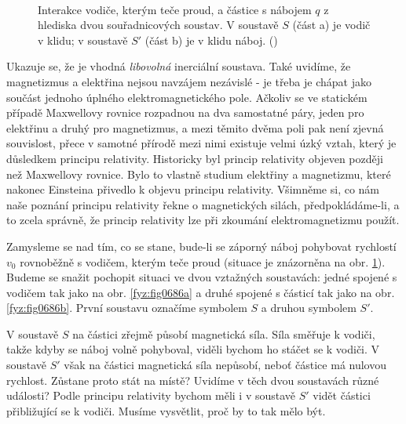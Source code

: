     \begin{figure}[ht!]  %
      \centering
       \\
      \caption{Interakce vodiče, kterým teče proud, a částice s nábojem \(q\) z hlediska dvou
              souřadnicových soustav. V soustavě \(S\) (část a) je vodič v klidu; v soustavě \(S'\)
              (část b) je v klidu náboj. (\cite[s.~234]{Feynman02})}
      \label{fyz:fig0686}
    \end{figure}

    Ukazuje se, že je vhodná \emph{libovolná} inerciální soustava. Také uvidíme, že magnetizmus a
    elektřina nejsou navzájem nezávislé - je třeba je chápat jako součást jednoho úplného
    elektromagnetického pole. Ačkoliv se ve statickém případě Maxwellovy rovnice rozpadnou na dva
    samostatné páry, jeden pro elektřinu a druhý pro magnetizmus, a mezi těmito dvěma poli pak není
    zjevná souvislost, přece v samotné přírodě mezi nimi existuje velmi úzký vztah, který je
    důsledkem principu relativity. Historicky byl princip relativity objeven později než Maxwellovy
    rovnice. Bylo to vlastně studium elektřiny a magnetizmu, které nakonec Einsteina přivedlo k
    objevu principu relativity. Všimněme si, co nám naše poznání principu relativity řekne o
    magnetických silách, předpokládáme-li, a to zcela správně, že princip relativity lze při
    zkoumání elektromagnetizmu použít.

    Zamysleme se nad tím, co se stane, bude-li se záporný náboj pohybovat rychlostí \(v_0\)
    rovnoběžně s vodičem, kterým teče proud (situace je znázorněna na obr. \ref{fyz:fig0686}). Budeme
    se snažit pochopit situaci ve dvou vztažných soustavách: jedné spojené s vodičem tak jako na
    obr. \ref{fyz:fig0686a} a druhé spojené s částicí tak jako na obr. \ref{fyz:fig0686b}. První
    soustavu označíme symbolem \(S\) a druhou symbolem \(S'\).

    V soustavě \(S\) na částici zřejmě působí magnetická síla. Síla směřuje k vodiči, takže kdyby se
    náboj volně pohyboval, viděli bychom ho stáčet se k vodiči. V soustavě \(S'\) však na částici
    magnetická síla nepůsobí, neboť částice má nulovou rychlost. Zůstane proto stát na místě?
    Uvidíme v těch dvou soustavách různé události? Podle principu relativity bychom měli i v
    soustavě \(S'\) vidět částici přibližující se k vodiči. Musíme vysvětlit, proč by to tak mělo
    být.

